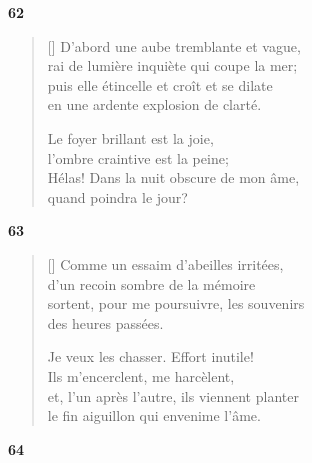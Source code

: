 \documentclass[a4paper,12pt]{book}
\begin{document}
\bigskip

\begin{center}
  \textbf{62}
\end{center}

\settowidth{\versewidth}{puis elle étincelle et croît et se dilate}

\begin{verse}[\versewidth]
  D'abord une aube tremblante et vague, \\
  rai de lumière inquiète qui coupe la mer; \\
  puis elle étincelle et croît et se dilate \\
  en une ardente explosion de clarté.

  Le foyer brillant est la joie, \\
  l'ombre craintive est la peine; \\
  Hélas! Dans la nuit obscure de mon âme, \\
  quand poindra le jour?
\end{verse}

\bigskip

\begin{center}
  \textbf{63}
\end{center}

\settowidth{\versewidth}{et, l'un après l'autre, ils viennent planter}

\begin{verse}[\versewidth]
  Comme un essaim d'abeilles irritées, \\
  d'un recoin sombre de la mémoire \\
  sortent, pour me poursuivre, les souvenirs \\
  des heures passées.

  Je veux les chasser. Effort inutile! \\
  Ils m'encerclent, me harcèlent, \\
  et, l'un après l'autre, ils viennent planter \\
  le fin aiguillon qui envenime l'âme.
\end{verse}

\bigskip

\begin{center}
  \textbf{64}
\end{center}
\end{document}
